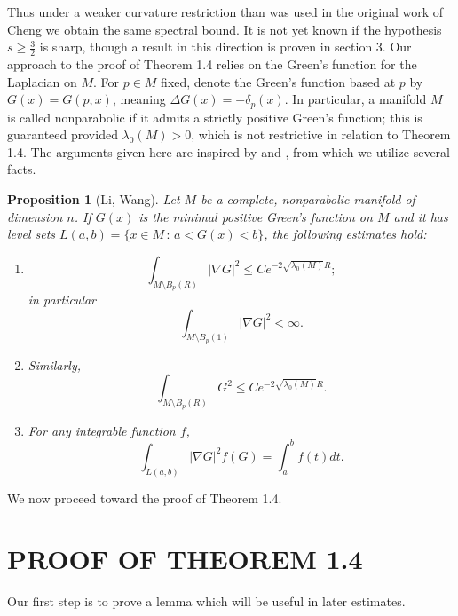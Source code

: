 \documentclass{amsart}
\newtheorem{proposition}{Proposition}
\theoremstyle{definition}
\theoremstyle{remark}
\numberwithin{equation}{section}
\begin{document}
Thus under a weaker curvature restriction than was used in the original work of Cheng we obtain the same spectral bound. It is not yet known if the hypothesis $s\geq \frac{3}{2}$ is sharp, though a result in this direction is proven in section 3. Our approach to the proof of Theorem 1.4 relies on the Green's function for the Laplacian on $M$. For $p\in M$ fixed, denote the Green's function based at $p$ by $G(x) = G(p,x)$, meaning $\Delta G(x) = -\delta_p(x)$. In particular, a manifold $M$ is called nonparabolic if it admits a strictly positive Green's function; this is guaranteed provided $\lambda_0(M)>0$, which is not restrictive in relation to Theorem 1.4. The arguments given here are inspired by \cite{MSW} and \cite{LW}, from which we utilize several facts.

\begin{proposition}[Li, Wang] Let $M$ be a complete, nonparabolic manifold of dimension $n$. If $G(x)$ is the minimal positive Green's function on $M$ and it has level sets $L(a,b) = \{x\in M\,:\,a<G(x)<b\}$, the following estimates hold:

 \begin{enumerate}
    \item  
    \begin{equation*}
    \int_{M\setminus B_p(R)}|\nabla G|^2\leq Ce^{-2\sqrt{\lambda_0(M)}R};
    \end{equation*}
    in particular
    \begin{equation*}
    \int_{M\setminus B_p(1)}|\nabla G|^2<\infty.
     \end{equation*}

    \item Similarly,
    \begin{equation*}
    \int_{M\setminus B_p(R)}G^2\leq Ce^{-2\sqrt{\lambda_0(M)}R}.
    \end{equation*}

    \item For any integrable function $f$,
    \begin{equation*}
    \int_{L(a,b)}|\nabla G|^2f(G)=\int_a^b f(t)dt.
    \end{equation*}
\end{enumerate} 
\end{proposition}
We now proceed toward the proof of Theorem 1.4.
\section{PROOF OF THEOREM 1.4}
Our first step is to prove a lemma which will be useful in later estimates.
\end{document}
